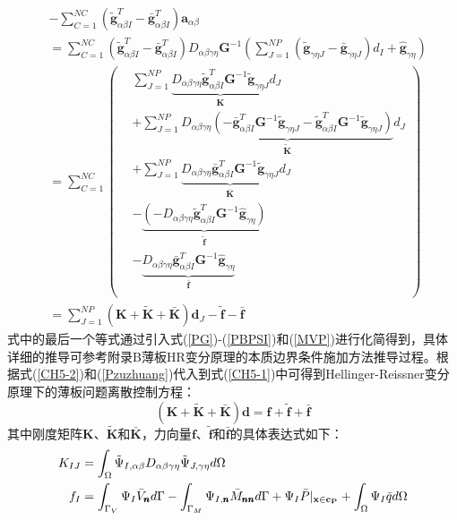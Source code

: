 \begin{equation}
\begin{split}\label{Pzuzhuang}
    &-\sum_{C=1}^{N\!C}(\tilde{\pmb g}_{\alpha\beta I}^T-\bar{\pmb g}_{\alpha\beta I}^T)\pmb a_{\alpha\beta}\\
    &=\sum_{C=1}^{N\!C}(\tilde{\pmb g}_{\alpha\beta I}^T-\bar{\pmb g}_{\alpha\beta I}^T)D_{\alpha\beta\gamma\eta}\pmb{G}^{-1}(\sum_{J=1}^{N\!P}(\tilde{\pmb g}_{\gamma\eta J}-\bar{\pmb g}_{\gamma\eta J})d_I+\hat{\pmb g}_{\gamma\eta})\\
    &=\sum_{C=1}^{N\!C}
    \left(\begin{split}
    &\sum_{J=1}^{N\!P}\underbrace{D_{\alpha\beta\gamma\eta}\tilde{\pmb g}_{\alpha\beta I}^T\pmb G^{-1}\tilde{\pmb g}_{\gamma\eta J}}_{\pmb{K}}d_J\\
    &+\sum_{J=1}^{N\!P}\underbrace{D_{\alpha\beta\gamma\eta}(-\bar{\pmb g}_{\alpha\beta I}^T\pmb G^{-1}\tilde{\pmb g}_{\gamma\eta J}-\tilde{\pmb g}_{\alpha\beta I}^T\pmb G^{-1}\tilde{\pmb g}_{\gamma\eta J})}_{\tilde{\pmb K}}d_J\\
    &+\sum_{J=1}^{N\!P}\underbrace{D_{\alpha\beta\gamma\eta}\bar{\pmb g}_{\alpha\beta I}^T\pmb G^{-1}\tilde{\pmb g}_{\gamma\eta J}}_{\bar{\pmb K}}d_J\\
    &-\underbrace{(-D_{\alpha\beta\gamma\eta}\tilde{\pmb g}_{\alpha\beta I}^T\pmb G^{-1}\hat{\pmb g}_{\gamma\eta })}_{\tilde{\pmb f}}\\
    &-\underbrace{D_{\alpha\beta\gamma\eta}\bar{\pmb g}_{\alpha\beta I}^T\pmb G^{-1}\hat{\pmb g}_{\gamma\eta }}_{\bar{\pmb f}}\\
    \end{split}\right)\\
    &=\sum_{J=1}^{N\!P}(\pmb{K}+\tilde{\pmb{K}}+\bar{\pmb{K}})\pmb d_J-\tilde{\pmb f}-\bar{\pmb f}
\end{split}
\end{equation}
式中的最后一个等式通过引入式(\ref{PG})-(\ref{PBPSI})和(\ref{MVP})进行化简得到，具体详细的推导可参考附录B薄板HR变分原理的本质边界条件施加方法推导过程。根据式(\ref{CH5-2})和(\ref{Pzuzhuang})代入到式(\ref{CH5-1})中可得到Hellinger-Reissner变分原理下的薄板问题离散控制方程：
\begin{equation}\label{equationP}
    (\pmb{K}+\tilde{\pmb K}+\bar{\pmb K})\pmb{d}=\pmb{f}+\tilde{\pmb f}+\bar{\pmb f}
\end{equation}
其中刚度矩阵$\pmb K$、$\tilde{\pmb K}$和$\bar{\pmb K}$，力向量$\pmb f$、$\tilde{\pmb f}$和$\bar{\pmb f}$的具体表达式如下：
\begin{subequations}\label{PHR1}
\begin{align}
    \label{PHR11}K_{IJ}&=\int_{\Omega}\tilde{\Psi}_{I,\alpha\beta}D_{\alpha\beta\gamma\eta}\tilde{\Psi}_{J,\gamma\eta}d\Omega \\
    \label{PHR12}f_I&=\int_{\Gamma_V}\Psi_I\bar{V}_{\pmb{n}}d\Gamma-\int_{\Gamma_M}\Psi_{I,\pmb{n}}\bar{M}_{\pmb{nn}}d\Gamma+\Psi_I\bar{P}\vert_{\bf{x}\in c_P}+\int_{\Omega}\Psi_I\bar{q}d\Omega
\end{align}
\end{subequations}
